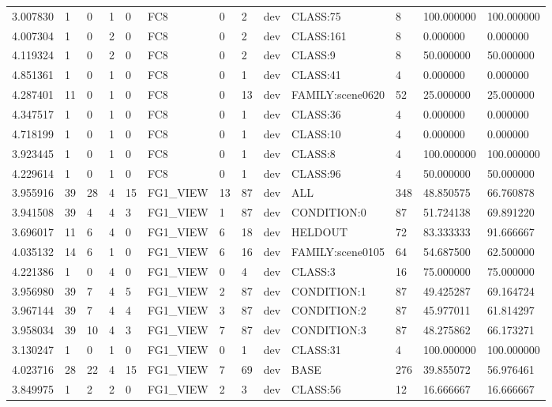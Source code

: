 \begin{tabular}{lllllllllllll}
3.007830 & 1 & 0 & 1 & 0 & FC8 & 0 & 2 & dev & CLASS:75 & 8 & 100.000000 & 100.000000 \\
4.007304 & 1 & 0 & 2 & 0 & FC8 & 0 & 2 & dev & CLASS:161 & 8 & 0.000000 & 0.000000 \\
4.119324 & 1 & 0 & 2 & 0 & FC8 & 0 & 2 & dev & CLASS:9 & 8 & 50.000000 & 50.000000 \\
4.851361 & 1 & 0 & 1 & 0 & FC8 & 0 & 1 & dev & CLASS:41 & 4 & 0.000000 & 0.000000 \\
4.287401 & 11 & 0 & 1 & 0 & FC8 & 0 & 13 & dev & FAMILY:scene0620 & 52 & 25.000000 & 25.000000 \\
4.347517 & 1 & 0 & 1 & 0 & FC8 & 0 & 1 & dev & CLASS:36 & 4 & 0.000000 & 0.000000 \\
4.718199 & 1 & 0 & 1 & 0 & FC8 & 0 & 1 & dev & CLASS:10 & 4 & 0.000000 & 0.000000 \\
3.923445 & 1 & 0 & 1 & 0 & FC8 & 0 & 1 & dev & CLASS:8 & 4 & 100.000000 & 100.000000 \\
4.229614 & 1 & 0 & 1 & 0 & FC8 & 0 & 1 & dev & CLASS:96 & 4 & 50.000000 & 50.000000 \\
3.955916 & 39 & 28 & 4 & 15 & FG1\_VIEW & 13 & 87 & dev & ALL & 348 & 48.850575 & 66.760878 \\
3.941508 & 39 & 4 & 4 & 3 & FG1\_VIEW & 1 & 87 & dev & CONDITION:0 & 87 & 51.724138 & 69.891220 \\
3.696017 & 11 & 6 & 4 & 0 & FG1\_VIEW & 6 & 18 & dev & HELDOUT & 72 & 83.333333 & 91.666667 \\
4.035132 & 14 & 6 & 1 & 0 & FG1\_VIEW & 6 & 16 & dev & FAMILY:scene0105 & 64 & 54.687500 & 62.500000 \\
4.221386 & 1 & 0 & 4 & 0 & FG1\_VIEW & 0 & 4 & dev & CLASS:3 & 16 & 75.000000 & 75.000000 \\
3.956980 & 39 & 7 & 4 & 5 & FG1\_VIEW & 2 & 87 & dev & CONDITION:1 & 87 & 49.425287 & 69.164724 \\
3.967144 & 39 & 7 & 4 & 4 & FG1\_VIEW & 3 & 87 & dev & CONDITION:2 & 87 & 45.977011 & 61.814297 \\
3.958034 & 39 & 10 & 4 & 3 & FG1\_VIEW & 7 & 87 & dev & CONDITION:3 & 87 & 48.275862 & 66.173271 \\
3.130247 & 1 & 0 & 1 & 0 & FG1\_VIEW & 0 & 1 & dev & CLASS:31 & 4 & 100.000000 & 100.000000 \\
4.023716 & 28 & 22 & 4 & 15 & FG1\_VIEW & 7 & 69 & dev & BASE & 276 & 39.855072 & 56.976461 \\
3.849975 & 1 & 2 & 2 & 0 & FG1\_VIEW & 2 & 3 & dev & CLASS:56 & 12 & 16.666667 & 16.666667 \\

\end{tabular}
